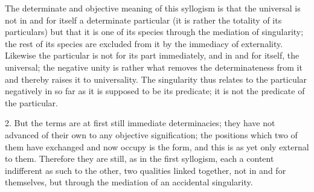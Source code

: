 The determinate and objective meaning of this syllogism is
that the universal is not in and for itself a determinate particular
(it is rather the totality of its particulars)
but that it is one of its species
through the mediation of singularity;
the rest of its species are excluded from
it by the immediacy of externality.
Likewise the particular is not for its part immediately,
and in and for itself, the universal;
the negative unity is rather what removes
the determinateness from it
and thereby raises it to universality.
The singularity thus relates to the particular negatively
in so far as it is supposed to be its predicate;
it is not the predicate of the particular.

2. But the terms are at first
still immediate determinacies;
they have not advanced of their own
to any objective signification;
the positions which two of them
have exchanged and now occupy is the form,
and this is as yet only external to them.
Therefore they are still, as in the first syllogism,
each a content indifferent as such to the other,
two qualities linked together, not in and for themselves,
but through the mediation of an accidental singularity.

